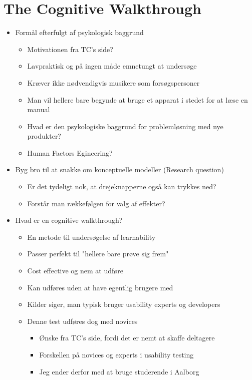 \chapter{The Cognitive Walkthrough}
\label{Cognitive Walkthrough}

\begin{itemize}
	\item Formål efterfulgt af psykologisk baggrund
	\begin{itemize}
		\item Motivationen fra TC's side?
		\item Lavpraktisk og på ingen måde emnetungt at undersøge
		\item Kræver ikke nødvendigvis musikere som forsøgspersoner
		\item Man vil hellere bare begynde at bruge et apparat i stedet for at læse en manual
		\item Hvad er den psykologiske baggrund for problemløsning med nye produkter?
		\item Human Factors Egineering?
	\end{itemize}

	
	\item Byg bro til at snakke om konceptuelle modeller (Research question)
	\begin{itemize}
		\item Er det tydeligt nok, at drejeknapperne også kan trykkes ned?
		\item Forstår man rækkefølgen for valg af effekter?
	\end{itemize}
	
	\item Hvad er en cognitive walkthrough?
	\begin{itemize}
		\item En metode til undersøgelse af learnability
		\item Passer perfekt til "hellere bare prøve sig frem"
		\item Cost effective og nem at udføre
		\item Kan udføres uden at have egentlig brugere med
		\item Kilder siger, man typisk bruger usability experts og developers
		\item Denne test udføres dog med novices
		\begin{itemize}
			\item Ønske fra TC's side, fordi det er nemt at skaffe deltagere
			\item Forskellen på novices og experts i usability testing
			\item Jeg ender derfor med at bruge studerende i Aalborg
		\end{itemize}
	\end{itemize}
	

\end{itemize}
